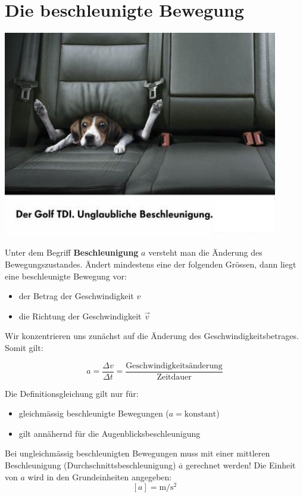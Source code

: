 \section{Die beschleunigte Bewegung}
\begin{marginfigure}
    \includegraphics[width=0.9\textwidth]{Bilder/beschleunigung.jpg}
\end{marginfigure}
Unter dem Begriff \textbf{Beschleunigung} $a$ versteht man die Änderung des Bewegungszustandes. Ändert mindestens eine der folgenden Grössen, dann liegt eine beschleunigte Bewegung vor:
\begin{itemize}
\item der Betrag der Geschwindigkeit $v$
\item die Richtung der Geschwindigkeit $\vec{v}$
\end{itemize}
Wir konzentrieren uns zunächst auf die Änderung des Geschwindigkeitsbetrages. Somit gilt:
\begin{definition}
\[ a = \frac{\Delta v}{\Delta t} = \frac{\text{Geschwindigkeitsänderung}}{\text{Zeitdauer}}\]
\end{definition}
Die Definitionsgleichung gilt nur für:
\begin{itemize}
	\item gleichmässig beschleunigte Bewegungen ($a=\text{konstant}$)
	\item gilt annähernd für die Augenblicksbeschleunigung
\end{itemize}
Bei ungleichmässig beschleunigten Bewegungen muss mit einer mittleren Beschleunigung (Durchschnittsbeschleunigung) $\overline{a}$ gerechnet werden!
Die Einheit von $a$ wird in den Grundeinheiten angegeben:
\[ [a] = \si{\metre \per \second \squared} \]
